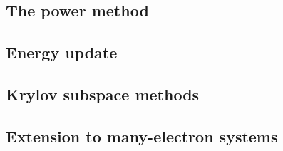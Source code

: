 \subsection{The power method}
\subsection{Energy update}
\subsection{Krylov subspace methods}
\subsection{Extension to many-electron systems}
